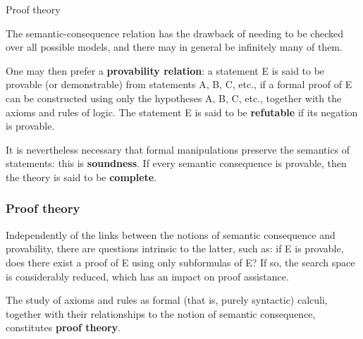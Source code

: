 \documentclass[compress,dvipdfmx]{beamer}
\begin{document}
%
\begin{frame}{Proof theory}

  The semantic-consequence relation has the drawback of needing to be
  checked over all possible models, and there may in general be
  infinitely many of them.

  \bigskip

  One may then prefer a \textbf{provability relation}: a statement E
  is said to be provable (or demonstrable) from statements A, B, C,
  etc., if a formal proof of E can be constructed using only the
  hypotheses A, B, C, etc., together with the axioms and rules of
  logic. The statement E is said to be \textbf{refutable} if its
  negation is provable.

  \bigskip

  It is nevertheless necessary that formal manipulations preserve the
  semantics of statements: this is \textbf{soundness}. If every
  semantic consequence is provable, then the theory is said to be
  \textbf{complete}.

\end{frame}

%
\begin{frame}
\frametitle{Proof theory}

Independently of the links between the notions of semantic
consequence and provability, there are questions intrinsic to the
latter, such as: if E is provable, does there exist a proof of E
using only subformulas of E? If so, the search space is
considerably reduced, which has an impact on proof assistance.

\bigskip

The study of axioms and rules as formal (that is, purely syntactic)
calculi, together with their relationships to the notion of semantic
consequence, constitutes \textbf{proof theory}.

\end{frame}
\end{document}
